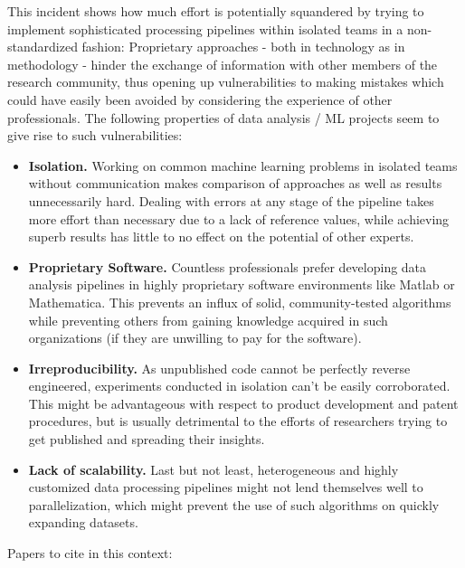 \par

This incident shows how much effort is potentially squandered by trying to implement sophisticated processing pipelines within isolated teams in a non-standardized fashion: Proprietary approaches - both in technology as in methodology - hinder the exchange of information with other members of the research community, thus opening up vulnerabilities to making mistakes which could have easily been avoided by considering the experience of other professionals. The following properties of data analysis / ML projects seem to give rise to such vulnerabilities:

\begin{itemize}
	\item \textbf{Isolation.} Working on common machine learning problems in isolated teams without communication makes comparison of approaches as well as results unnecessarily hard. Dealing with errors at any stage of the pipeline takes more effort than necessary due to a lack of reference values, while achieving superb results has little to no effect on the potential of other experts.
	\item \textbf{Proprietary Software.} Countless professionals prefer developing data analysis pipelines in highly proprietary software environments like Matlab or Mathematica. This prevents an influx of solid, community-tested algorithms while preventing others from gaining knowledge acquired in such organizations (if they are unwilling to pay for the software).
	\item \textbf{Irreproducibility.} As unpublished code cannot be perfectly reverse engineered, experiments conducted in isolation can't be easily corroborated. This might be advantageous with respect to product development and patent procedures, but is usually detrimental to the efforts of researchers trying to get published and spreading their insights.
	\item \textbf{Lack of scalability.} Last but not least, heterogeneous and highly customized data processing pipelines might not lend themselves well to parallelization, which might prevent the use of such algorithms on quickly expanding datasets.
\end{itemize}


Papers to cite in this context: \\
\cite{LargeScaleMLPipelines}
\cite{MLPipelineMLlib}
\cite{DataAnalysisDSWorkflow}
\cite{StanfordNLP}
\cite{MLPipelines}
\cite{Make2013}
\cite{AnalLifecycle}
\cite{DataScienceTools2013}
\cite{AnalOneComponent2013}



